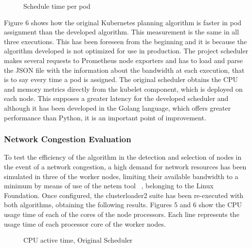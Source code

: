 \documentclass[conference]{IEEEtran}
\begin{document}
\begin{figure}[h]
\begin{center}
\strut{}
\caption{Schedule time per pod}\label{fig:cluster}
\end{center}
\end{figure}

Figure 6 shows how the original Kubernetes planning algorithm is faster in pod assignment than the developed algorithm. This measurement is the same in all three executions. This has been foreseen from 
the beginning and it is because the algorithm developed is not optimized for use in production. The project scheduler makes several requests to Prometheus node exporters and has to load and parse the JSON 
file with the information about the bandwidth at each execution, that is to say every time a pod is assigned. The original scheduler obtains the CPU and memory metrics directly from the kubelet component, 
which is deployed on each node. This supposes a greater latency for the developed scheduler and although it has been developed in the Golang language, which offers greater performance than Python, it is an 
important point of improvement.

\subsubsection{Network Congestion Evaluation}\label{sec:netcongest}

To test the efficiency of the algorithm in the detection and selection of nodes in the event of a network congestion, a high demand for network resources has been simulated in three of the worker nodes, 
limiting their available bandwidth to a minimum by means of use of the netem tool ~\cite{netem}, belonging to the Linux Foundation. Once configured, the clusterloader2 suite has been re-executed with both 
algorithms, obtaining the following results. Figures 5 and 6 show the CPU usage time of each of the cores of the node processors. Each line represents the usage time of each processor core of the worker 
nodes.

\begin{figure}[t]
\begin{center}
\strut{}
\caption{CPU active time, Original Scheduler}\label{fig:cluster}
\end{center}
\end{figure}
\end{document}
